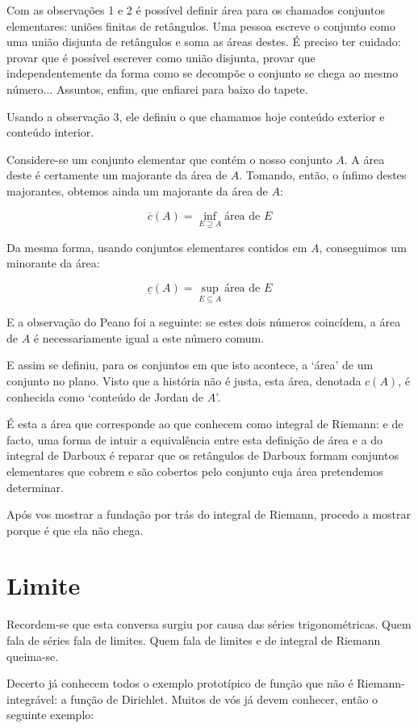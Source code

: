 \documentclass{article}
\begin{document}
Com as observações 1 e 2 é possível definir área para os chamados conjuntos elementares: uniões finitas de retângulos. Uma pessoa escreve o conjunto como uma união disjunta de retângulos e soma as áreas destes. É preciso ter cuidado: provar que é possível escrever como união disjunta, provar que independentemente da forma como se decompõe o conjunto se chega ao mesmo número... Assuntos, enfim, que enfiarei para baixo do tapete.

Usando a observação $3$, ele definiu o que chamamos hoje conteúdo exterior e conteúdo interior.

Considere-se um conjunto elementar que contém o nosso conjunto $A$. A área deste é certamente um majorante da área de $A$. Tomando, então, o ínfimo destes majorantes, obtemos ainda um majorante da área de $A$:

\[\overline c (A) = \inf_{E \supseteq A} \text{área de $E$}\]

Da mesma forma, usando conjuntos elementares contidos em $A$, conseguimos um minorante da área:

\[\underline c (A) = \sup_{E \subseteq A} \text{área de $E$}\]

E a observação do Peano foi a seguinte: se estes dois números coincídem, a área de $A$ é necessariamente igual a este número comum.

E assim se definiu, para os conjuntos em que isto acontece, a `área' de um conjunto no plano. Visto que a história não é justa, esta área, denotada $c(A)$, é conhecida como `conteúdo de Jordan de $A$'.

É esta a área que corresponde ao que conhecem como integral de Riemann: e de facto, uma forma de intuir a equivalência entre esta definição de área e a do integral de Darboux é reparar que os retângulos de Darboux formam conjuntos elementares que cobrem e são cobertos pelo conjunto cuja área pretendemos determinar.

Após vos mostrar a fundação por trás do integral de Riemann, procedo a mostrar porque é que ela não chega.

\section{Limite}

Recordem-se que esta conversa surgiu por causa das séries trigonométricas. Quem fala de séries fala de limites. Quem fala de limites e de integral de Riemann queima-se.

Decerto já conhecem todos o exemplo prototípico de função que não é Riemann-integrável: a função de Dirichlet. Muitos de vós já devem conhecer, então o seguinte exemplo:
\end{document}
